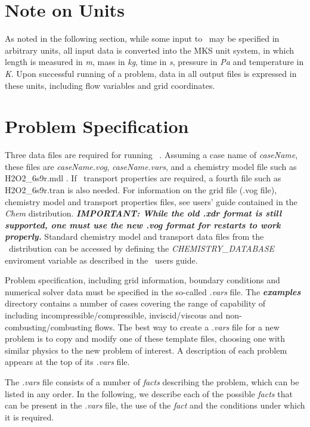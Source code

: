 \documentclass{article}
\begin{document}
\section{Note on Units}

As noted in the following section, while some input to \Stream\ may be
specified in arbitrary units, all input data is converted into the MKS unit
system, in which length is measured in \emph{m}, mass in \emph{kg}, time in
\emph{s}, pressure in \emph{Pa} and temperature in \emph{K}. Upon successful
running of a problem, data in all output files is expressed in these units,
including flow variables and grid coordinates.

\section{Problem Specification}

Three data files are required for running \Stream\ . Assuming a case name
of \emph{caseName}, these files are \emph{caseName.vog}, \emph{caseName.vars},
and a chemistry model file such as H2O2\_6s9r.mdl . If \Chemkin\ transport
properties are required, a fourth file such as H2O2\_6s9r.tran is also needed.
For information on the grid file (.vog file), chemistry model and transport
properties files, see users' guide contained in the \emph{Chem}
distribution. \emph{\bf IMPORTANT: While the old .xdr format is still
supported, one must use the new .vog format for restarts to work properly.}
Standard chemistry model and transport data files from the
\Chem\ distribution can be accessed by defining the \emph{CHEMISTRY\_DATABASE}
enviroment variable as described in the \Chem\ users guide.

Problem specification, including grid information, boundary conditions and
numerical solver data must be specified in the so-called \emph{.vars} file.
The \emph{\bf examples} directory contains a number of cases covering the range
of capability of \Stream\, including incompressible/compressible,
inviscid/viscous and non-combusting/combusting flows. The best way to create a
\emph{.vars} file for a new problem is to copy and modify one of these template
files, choosing one with similar physics to the new problem of interest. A
description of each problem appears at the top of its \emph{.vars} file.

The \emph{.vars} file consists of a number of \emph{facts} describing the
problem, which can be listed in any order. In the following, we describe each
of the possible \emph{facts} that can be present in the \emph{.vars} file, the
use of the \emph{fact} and the conditions under which it is required.
\end{document}
